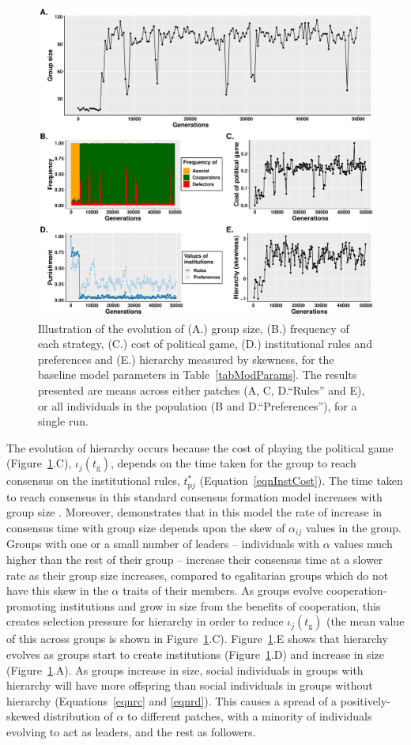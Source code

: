 \documentclass{rstb}
\begin{document}
\begin{linenumbers}
\begin{figure}
    \centering
    \includegraphics[width=0.8\linewidth]{Figures/pt_summary.pdf}
    \caption{Illustration of the evolution of (A.) group size, (B.) frequency of each strategy, (C.) cost of political game, (D.) institutional rules and preferences and (E.) hierarchy measured by skewness, for the baseline model parameters in Table~\ref{tabModParams}. The results presented are means across either patches (A, C, D.``Rules'' and E), or all individuals in the population (B and D.``Preferences''), for a single run.}
    \label{figBaseline}
\end{figure}

 The evolution of hierarchy occurs because the cost of playing the political game (Figure~\ref{figBaseline}.C), $\iota_j(t_\mathrm{g})$, depends on the time taken for the group to reach consensus on the institutional rules, $t_{\mathrm{p}j}^*$ (Equation~\ref{eqnInstCost}). The time taken to reach consensus in this standard consensus formation model increases with group size \cite{Perret:2020:a}. Moreover, \cite{Perret:2020:a} demonstrates that in this model the rate of increase in consensus time with group size depends upon the skew of $\alpha_{ij}$ values in the group. Groups with one or a small number of leaders -- individuals with $\alpha$ values much higher than the rest of their group -- increase their consensus time at a slower rate as their group size increases, compared to egalitarian groups which do not have this skew in the $\alpha$ traits of their members. As groups evolve cooperation-promoting institutions and grow in size from the benefits of cooperation, this creates selection pressure for hierarchy in order to reduce $\iota_j(t_\mathrm{g})$ (the mean value of this across groups is shown in Figure~\ref{figBaseline}.C). Figure~\ref{figBaseline}.E shows that hierarchy evolves as groups start to create institutions (Figure~\ref{figBaseline}.D) and increase in size (Figure~\ref{figBaseline}.A). As groups increase in size, social individuals in groups with hierarchy will have more offspring than social individuals in groups without hierarchy (Equations~\ref{eqnrc} and \ref{eqnrd}). This causes a spread of a positively-skewed distribution of $\alpha$ to different patches, with a minority of individuals evolving to act as leaders, and the rest as followers.


\end{linenumbers}
\end{document}
